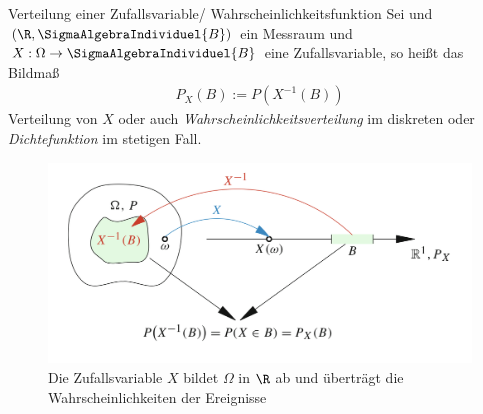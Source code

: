 \begin{Definition}{Verteilung einer Zufallsvariable/ Wahrscheinlichkeitsfunktion}
	Sei \WRaum und $(\R, \SigmaAlgebraIndividuel{B})$ ein Messraum und $X: \Omega \rightarrow \SigmaAlgebraIndividuel{B}$ eine Zufallsvariable, so heißt das Bildmaß
	\begin{align*}
		P_X(B):=P(X^{-1}(B))
	\end{align*}
	Verteilung von $X$ oder auch \textit{Wahrscheinlichkeitsverteilung} im diskreten oder \textit{Dichtefunktion} im stetigen Fall.
\end{Definition}
\begin{figure}[H]
	\centering
	\includegraphics[scale = 0.4]{attachment/chapter_9/Scc002}
	\caption{Die Zufallsvariable $X$ bildet $\Omega$ in $\R$ ab und überträgt die Wahrscheinlichkeiten der Ereignisse}
\end{figure}

